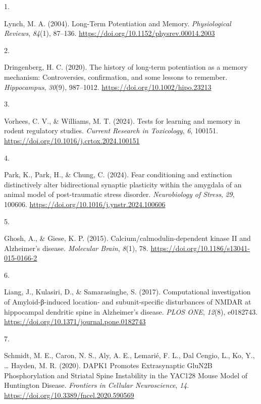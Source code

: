 \documentclass[
  11pt,
  letterpaper,
]{scrreprt}
\newlength{\cslhangindent}
\newlength{\csllabelwidth}
\newenvironment{CSLReferences}[2] %
 {\begin{list}{}{%
  \setlength{\itemindent}{0pt}
  \setlength{\leftmargin}{0pt}
  \setlength{\parsep}{0pt}
  \ifodd #1
   \setlength{\leftmargin}{\cslhangindent}
   \setlength{\itemindent}{-1\cslhangindent}
  \fi
  \setlength{\itemsep}{#2\baselineskip}}}
 {\end{list}}
\newcommand{\CSLLeftMargin}[1]{\parbox[t]{\csllabelwidth}{\strut#1\strut}}
\newcommand{\CSLRightInline}[1]{\parbox[t]{\linewidth - \csllabelwidth}{\strut#1\strut}}
\begin{document}

\label{refs}
\begin{CSLReferences}{0}{0}
\CSLLeftMargin{1. }%
\CSLRightInline{Lynch, M. A. (2004). Long-{Term Potentiation} and
{Memory}. \emph{Physiological Reviews}, \emph{84}(1), 87--136.
\url{https://doi.org/10.1152/physrev.00014.2003}}

\CSLLeftMargin{2. }%
\CSLRightInline{Dringenberg, H. C. (2020). The history of long-term
potentiation as a memory mechanism: {Controversies}, confirmation, and
some lessons to remember. \emph{Hippocampus}, \emph{30}(9), 987--1012.
\url{https://doi.org/10.1002/hipo.23213}}

\CSLLeftMargin{3. }%
\CSLRightInline{Vorhees, C. V., \& Williams, M. T. (2024). Tests for
learning and memory in rodent regulatory studies. \emph{Current Research
in Toxicology}, \emph{6}, 100151.
\url{https://doi.org/10.1016/j.crtox.2024.100151}}

\CSLLeftMargin{4. }%
\CSLRightInline{Park, K., Park, H., \& Chung, C. (2024). Fear
conditioning and extinction distinctively alter bidirectional synaptic
plasticity within the amygdala of an animal model of post-traumatic
stress disorder. \emph{Neurobiology of Stress}, \emph{29}, 100606.
\url{https://doi.org/10.1016/j.ynstr.2024.100606}}

\CSLLeftMargin{5. }%
\CSLRightInline{Ghosh, A., \& Giese, K. P. (2015).
Calcium/calmodulin-dependent kinase {II} and {Alzheimer}'s disease.
\emph{Molecular Brain}, \emph{8}(1), 78.
\url{https://doi.org/10.1186/s13041-015-0166-2}}

\CSLLeftMargin{6. }%
\CSLRightInline{Liang, J., Kulasiri, D., \& Samarasinghe, S. (2017).
Computational investigation of {Amyloid-β-induced} location- and
subunit-specific disturbances of {NMDAR} at hippocampal dendritic spine
in {Alzheimer}'s disease. \emph{PLOS ONE}, \emph{12}(8), e0182743.
\url{https://doi.org/10.1371/journal.pone.0182743}}

\CSLLeftMargin{7. }%
\CSLRightInline{Schmidt, M. E., Caron, N. S., Aly, A. E., Lemarié, F.
L., Dal Cengio, L., Ko, Y., \ldots{} Hayden, M. R. (2020). {DAPK1
Promotes Extrasynaptic GluN2B Phosphorylation} and {Striatal Spine
Instability} in the {YAC128 Mouse Model} of {Huntington Disease}.
\emph{Frontiers in Cellular Neuroscience}, \emph{14}.
\url{https://doi.org/10.3389/fncel.2020.590569}}


\end{CSLReferences}
\end{document}
